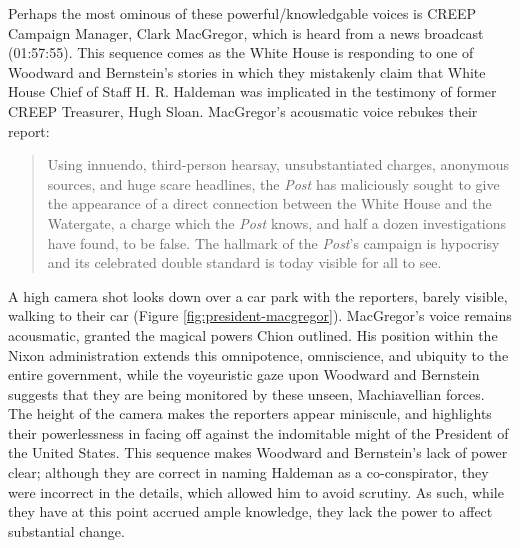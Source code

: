 Perhaps the most ominous of these powerful/knowledgable voices is CREEP Campaign Manager, Clark MacGregor, which is heard from a news broadcast (01:57:55).
This sequence comes as the White House is responding to one of Woodward and Bernstein's stories in which they mistakenly claim that White House Chief of Staff H. R. Haldeman was implicated in the testimony of former CREEP Treasurer, Hugh Sloan.
MacGregor's acousmatic voice rebukes their report:
\begin{quote}
Using innuendo, third-person hearsay, unsubstantiated charges, anonymous sources, and huge scare headlines, the \textit{Post} has maliciously sought to give the appearance of a direct connection between the White House and the Watergate, a charge which the \textit{Post} knows, and half a dozen investigations have found, to be false. The hallmark of the \textit{Post}'s campaign is hypocrisy and its celebrated double standard is today visible for all to see.
\end{quote}
A high camera shot looks down over a car park with the reporters, barely visible, walking to their car (Figure \ref{fig:president-macgregor}).
MacGregor's voice remains acousmatic, granted the magical powers Chion outlined.
His position within the Nixon administration extends this omnipotence, omniscience, and ubiquity to the entire government, while the voyeuristic gaze upon Woodward and Bernstein suggests that they are being monitored by these unseen, Machiavellian forces. 
The height of the camera makes the reporters appear miniscule, and highlights their powerlessness in facing off against the indomitable might of the President of the United States.
This sequence makes Woodward and Bernstein's lack of power clear; although they are correct in naming Haldeman as a co-conspirator, they were incorrect in the details, which allowed him to avoid scrutiny.
As such, while they have at this point accrued ample knowledge, they lack the power to affect substantial change.

